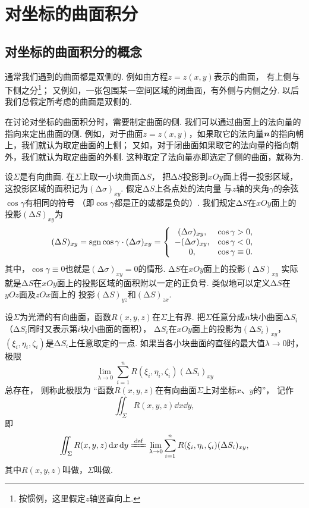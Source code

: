 \section{对坐标的曲面积分}
\subsection{对坐标的曲面积分的概念}
通常我们遇到的曲面都是双侧的.
例如由方程\(z = z(x,y)\)表示的曲面，
有上侧与下侧之分\footnote{按惯例，这里假定\(z\)轴竖直向上.}；
又例如，一张包围某一空间区域的闭曲面，有外侧与内侧之分.
以后我们总假定所考虑的曲面是双侧的.

在讨论对坐标的曲面积分时，需要制定曲面的侧.
我们可以通过曲面上的法向量的指向来定出曲面的侧.
例如，对于曲面\(z = z(x,y)\)，如果取它的法向量\(\boldsymbol{n}\)的指向朝上，我们就认为取定曲面的上侧；
又如，对于闭曲面如果取它的法向量的指向朝外，我们就认为取定曲面的外侧.
这种取定了法向量亦即选定了侧的曲面，就称为.

设\(\Sigma\)是有向曲面.
在\(\Sigma\)上取一小块曲面\(\increment S\)，
把\(\increment S\)投影到\(xOy\)面上得一投影区域，
这投影区域的面积记为\((\increment\sigma)_{xy}\).
假定\(\increment S\)上各点处的法向量
与\(z\)轴的夹角\(\gamma\)的余弦\(\cos\gamma\)有相同的符号
（即\(\cos\gamma\)都是正的或都是负的）.
我们规定\(\increment S\)在\(xOy\)面上的投影\((\increment S)_{xy}\)为\[
	(\Delta S)_{xy}
	= \operatorname{sgn}\cos\gamma \cdot (\Delta \sigma)_{xy}
	= \left\{ \begin{array}{cc}
	(\Delta \sigma)_{xy}, & \cos\gamma > 0, \\
	-(\Delta \sigma)_{xy}, & \cos\gamma < 0, \\
	0, & \cos\gamma \equiv 0.
	\end{array} \right.
\]
其中，\(\cos\gamma \equiv 0\)也就是\((\increment \sigma)_{xy} = 0\)的情形.
\(\increment S\)在\(xOy\)面上的投影\((\increment S)_{xy}\)
实际就是\(\increment S\)在\(xOy\)面上的投影区域的面积附以一定的正负号.
类似地可以定义\(\increment S\)在\(yOz\)面及\(zOx\)面上的
投影\((\increment S)_{yz}\)和\((\increment S)_{zx}\).

设\(\Sigma\)为光滑的有向曲面，函数\(R(x,y,z)\)在\(\Sigma\)上有界.
把\(\Sigma\)任意分成\(n\)块小曲面\(\increment S_i\)%
（\(\increment S_i\)同时又表示第\(i\)块小曲面的面积），
\(\increment S_i\)在\(xOy\)面上的投影为\((\increment S_i)_{xy}\)，
\((\xi_i,\eta_i,\zeta_i)\)是\(\increment S_i\)上任意取定的一点.
如果当各小块曲面的直径的最大值\(\lambda\to0\)时，极限\[
	\lim\limits_{\lambda\to0}
	\sum\limits_{i=1}^n
	R(\xi_i,\eta_i,\zeta_i)
	(\increment S_i)_{xy}
\]总存在，
则称此极限为
“函数\(R(x,y,z)\)在有向曲面\(\Sigma\)上对坐标\(x\)、\(y\)的”，
记作\[
	\iint_\Sigma R(x,y,z) \dd{x}\dd{y},
\]
即\[
	\iint_\Sigma R(x,y,z) \dd{x}\dd{y}
	\defeq
	\lim\limits_{\lambda\to0}
	\sum\limits_{i=1}^n
	R(\xi_i,\eta_i,\zeta_i)
	(\increment S_i)_{xy},
\]
其中\(R(x,y,z)\)叫做，\(\Sigma\)叫做.

